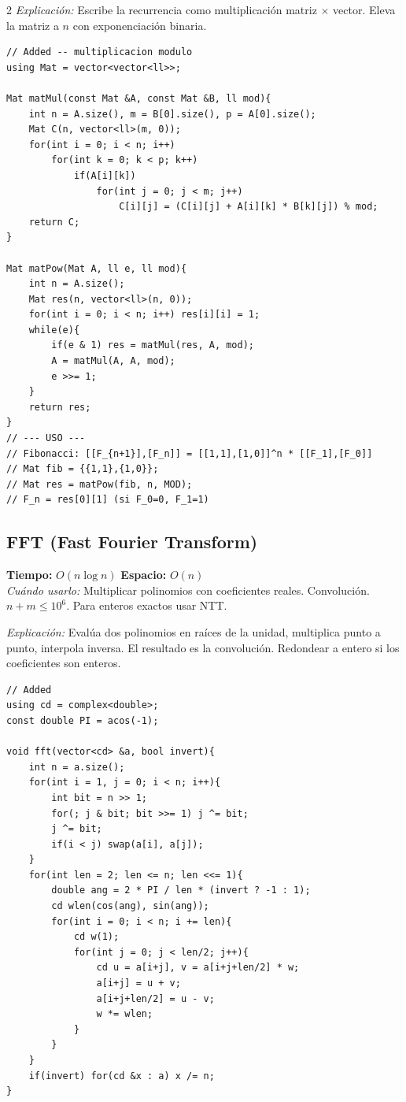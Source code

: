\documentclass[10pt,a4paper]{article}
\begin{document}
\begin{multicols}{2}
\textit{Explicaci\'on:} Escribe la recurrencia como multiplicaci\'on matriz $\times$ vector. Eleva la matriz a $n$ con exponenciaci\'on binaria.

\begin{lstlisting}
// Added -- multiplicacion modulo
using Mat = vector<vector<ll>>;

Mat matMul(const Mat &A, const Mat &B, ll mod){
    int n = A.size(), m = B[0].size(), p = A[0].size();
    Mat C(n, vector<ll>(m, 0));
    for(int i = 0; i < n; i++)
        for(int k = 0; k < p; k++)
            if(A[i][k])
                for(int j = 0; j < m; j++)
                    C[i][j] = (C[i][j] + A[i][k] * B[k][j]) % mod;
    return C;
}

Mat matPow(Mat A, ll e, ll mod){
    int n = A.size();
    Mat res(n, vector<ll>(n, 0));
    for(int i = 0; i < n; i++) res[i][i] = 1;
    while(e){
        if(e & 1) res = matMul(res, A, mod);
        A = matMul(A, A, mod);
        e >>= 1;
    }
    return res;
}
// --- USO ---
// Fibonacci: [[F_{n+1}],[F_n]] = [[1,1],[1,0]]^n * [[F_1],[F_0]]
// Mat fib = {{1,1},{1,0}};
// Mat res = matPow(fib, n, MOD);
// F_n = res[0][1] (si F_0=0, F_1=1)
\end{lstlisting}


\subsection{FFT (Fast Fourier Transform)}
\textbf{Tiempo:} $O(n \log n)$ \quad \textbf{Espacio:} $O(n)$\\
\textit{Cu\'ando usarlo:} Multiplicar polinomios con coeficientes reales. Convoluci\'on. $n+m \leq 10^6$. Para enteros exactos usar NTT.

\textit{Explicaci\'on:} Eval\'ua dos polinomios en ra\'ices de la unidad, multiplica punto a punto, interpola inversa. El resultado es la convoluci\'on. Redondear a entero si los coeficientes son enteros.

\begin{lstlisting}
// Added
using cd = complex<double>;
const double PI = acos(-1);

void fft(vector<cd> &a, bool invert){
    int n = a.size();
    for(int i = 1, j = 0; i < n; i++){
        int bit = n >> 1;
        for(; j & bit; bit >>= 1) j ^= bit;
        j ^= bit;
        if(i < j) swap(a[i], a[j]);
    }
    for(int len = 2; len <= n; len <<= 1){
        double ang = 2 * PI / len * (invert ? -1 : 1);
        cd wlen(cos(ang), sin(ang));
        for(int i = 0; i < n; i += len){
            cd w(1);
            for(int j = 0; j < len/2; j++){
                cd u = a[i+j], v = a[i+j+len/2] * w;
                a[i+j] = u + v;
                a[i+j+len/2] = u - v;
                w *= wlen;
            }
        }
    }
    if(invert) for(cd &x : a) x /= n;
}


\end{lstlisting}
\end{multicols}
\end{document}
